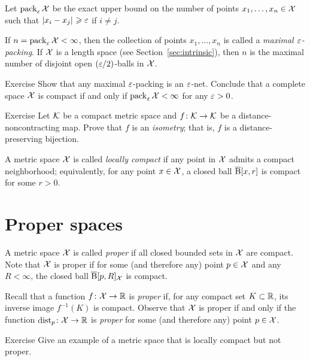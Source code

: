 Let $\operatorname{\rm pack}\nolimits_\varepsilon\mathcal{X}$ be the exact upper bound on the number of points $x_1,\z\dots,x_n\in \spc{X}$ such that $\dist{x_i}{x_j}{}\ge\eps$ if $i\ne j$.

If $n=\operatorname{\rm pack}\nolimits_\varepsilon\mathcal{X}<\infty$, then
the collection of points $x_1,\dots,x_n$ is called a \emph{maximal $\varepsilon$-packing}.
If $\mathcal{X}$ is a length space (see Section~\ref{sec:intrinsic}), then $n$ is the maximal number of disjoint open $(\varepsilon/2)$-balls in $\mathcal{X}$.

\begin{thm}{Exercise}\label{ex:pack-net}
Show that any maximal $\varepsilon$-packing is an $\varepsilon$-net.
Conclude that a complete space $\mathcal{X}$ is compact if and only if $\pack_\eps\spc{X}\z<\infty$ for any $\varepsilon>0$.
\end{thm}


\begin{thm}{Exercise}\label{ex:non-contracting-map}
Let $\mathcal{K}$  be a compact metric space and
$f\:\spc{K}\z\to \spc{K}$
be a distance-noncontracting map.
Prove that $f$ is an \emph{isometry};
that is, $f$ is a distance-preserving bijection.
\end{thm}

A metric space $\mathcal{X}$ is called \emph{locally compact} if any point in $\mathcal{X}$ admits a compact neighborhood;
equivalently, for any point $x\in\mathcal{X}$, a closed ball $\overline{\mathrm{B}}{}[x,r]$ is compact for some $r>0$.

\section{Proper spaces}



A metric space $\mathcal{X}$ is called \emph{proper} if all closed bounded sets in $\mathcal{X}$ are compact.
Note that $\mathcal{X}$ is proper if for some (and therefore any) point $p\in \mathcal{X}$ and any $R<\infty$, 
the closed ball $\overline{\mathrm{B}}{}[p,R]_{\mathcal{X}}$ is compact.

Recall that a function $f\colon\mathcal{X}\to\mathbb{R}$ is \emph{proper} if, for any compact set $K\subset \mathbb{R}$, its inverse image $f^{-1}(K)$ is compact.
Observe that $\mathcal{X}$ is proper if and only if the function $\mathrm{dist}_p\colon\mathcal{X}\to\mathbb{R}$ is \emph{proper} for some (and therefore any) point $p\in \mathcal{X}$.

\begin{thm}{Exercise}\label{ex:loc-compact-not-proper}
Give an example of a metric space that is locally compact but not proper.
\end{thm}

